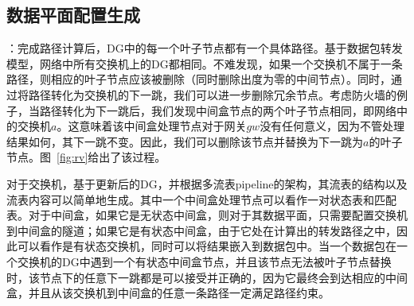 \documentclass{ctexart}
\newcommand{\para}[1]{\noindent {\bf #1}}%
\begin{document}
\subsection{数据平面配置生成}

\para{删除DG中冗余节点}：完成路径计算后，DG中的每一个叶子节点都有一个具体路径。基于数据包转发模型，网络中所有交换机上的DG都相同。不难发现，如果一个交换机不属于一条路径，则相应的叶子节点应该被删除（同时删除出度为零的中间节点）。同时，通过将路径转化为交换机的下一跳，我们可以进一步删除冗余节点。考虑防火墙的例子，当路径转化为下一跳后，我们发现中间盒节点的两个叶子节点相同，即网络中的交换机$a$。这意味着该中间盒处理节点对于网关$gw$没有任何意义，因为不管处理结果如何，其下一跳不变。因此，我们可以删除该节点并替换为下一跳为$a$的叶子节点。图~\ref{fig:rv}给出了该过程。



对于交换机，基于更新后的DG，并根据多流表pipeline的架构，其流表的结构以及流表内容可以简单地生成。其中一个中间盒处理节点可以看作一对状态表和匹配表。对于中间盒，如果它是无状态中间盒，则对于其数据平面，只需要配置交换机到中间盒的隧道；如果它是有状态中间盒，由于它处在计算出的转发路径之中，因此可以看作是有状态交换机，同时可以将结果嵌入到数据包中。当一个数据包在一个交换机的DG中遇到一个有状态中间盒节点，并且该节点无法被叶子节点替换时，该节点下的任意下一跳都是可以接受并正确的，因为它最终会到达相应的中间盒，并且从该交换机到中间盒的任意一条路径一定满足路径约束。

\end{document}
